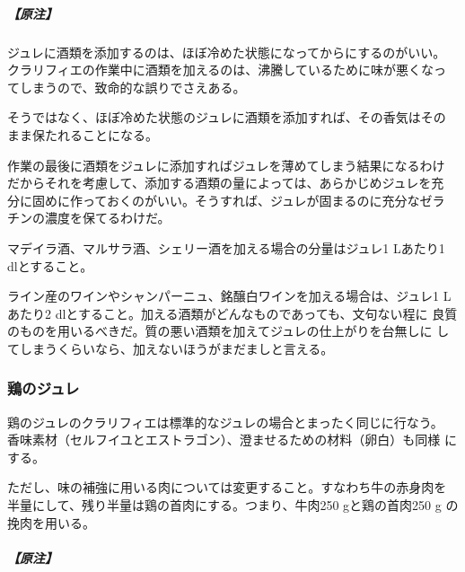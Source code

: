 \begin{recette}
\hypertarget{nota-gelees-grasses-ordinaires}{%
\subparagraph{【原注】}\label{nota-gelees-grasses-ordinaires}}

ジュレに酒類を添加するのは、ほぼ冷めた状態になってからにするのがいい。
クラリフィエの作業中に酒類を加えるのは、沸騰しているために味が悪くなっ
てしまうので、致命的な誤りでさえある。

そうではなく、ほぼ冷めた状態のジュレに酒類を添加すれば、その香気はその
まま保たれることになる。

作業の最後に酒類をジュレに添加すればジュレを薄めてしまう結果になるわけ
だからそれを考慮して、添加する酒類の量によっては、あらかじめジュレを充
分に固めに作っておくのがいい。そうすれば、ジュレが固まるのに充分なゼラ
チンの濃度を保てるわけだ。

マデイラ酒、マルサラ酒、シェリー酒を加える場合の分量はジュレ1 Lあたり1
dlとすること。

ライン産のワインやシャンパーニュ、銘醸白ワインを加える場合は、ジュレ1
Lあたり2 dlとすること。加える酒類がどんなものであっても、文句ない程に
良質のものを用いるべきだ。質の悪い酒類を加えてジュレの仕上がりを台無しに
してしまうくらいなら、加えないほうがまだましと言える。

\maeaki

\hypertarget{gelee-de-volaille}{%
\subsubsection{鶏のジュレ}\label{gelee-de-volaille}}



鶏のジュレのクラリフィエは標準的なジュレの場合とまったく同じに行なう。
香味素材（セルフイユとエストラゴン）、澄ませるための材料（卵白）も同様
にする。

ただし、味の補強に用いる肉については変更すること。すなわち牛の赤身肉を
半量にして、残り半量は鶏の首肉にする。つまり、牛肉250 gと鶏の首肉250 g
の挽肉を用いる。

\hypertarget{nota-gelee-de-volaile}{%
\subparagraph{【原注】}\label{nota-gelee-de-volaile}}


\end{recette}

